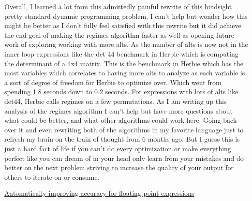 \documentclass{article}
\begin{document}
Overall, I learned a lot from this admittedly painful rewrite of this hindsight pretty standard dynamic programming problem. I can’t help but wonder how this might be better as I don’t fully feel satisfied with this rewrite but it did achieve the end goal of making the regimes algorithm faster as well as opening future work of exploring working with more alts. As the number of alts is now not in the inner loop expressions like the det 44 benchmark in Herbie which is computing the determinant of a 4x4 matrix. This is the benchmark in Herbie which has the most variables which correlates to having more alts to analyze as each variable is a sort of degree of freedom for Herbie to optimize over. Which went from spending 1.8 seconds down to 0.2 seconds. For expressions with lots of alts like det44, Herbie calls regimes on a few permutations. As I am writing up this analysis of the regimes algorithm I can’t help but have more questions about what could be better, and what other algorithms could work here. Going back over it and even rewriting both of the algorithms in my favorite language just to refresh my brain on the train of thought from 6 months ago. But I guess this is just a hard fact of life if you can’t do every optimization or make everything perfect like you can dream of in your head only learn from your mistakes and do better on the next problem striving to increase the quality of your output for others to iterate on or consume.

\href{https://dl.acm.org/doi/10.1145/2813885.2737959}{Automatically improving accuracy for floating point expressions}
\end{document}
